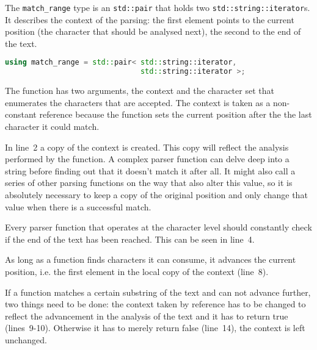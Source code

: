 \documentclass[12pt]{article}
\begin{document}
The \texttt{match\_range} type is an \texttt{std::pair} that holds two \texttt{std::string::iterator}s. It
describes the context of the parsing: the first element points to the current position (the character that
should be analysed next), the second to the end of the text.

\begin{center}
	\begin{minipage}[h]{0.8\textwidth}
		\begin{lstlisting}[language=C++, breaklines=true]
using match_range = std::pair< std::string::iterator,
                               std::string::iterator >;
		\end{lstlisting}
	\end{minipage}
\end{center}

The function has two arguments, the context and the character set that enumerates the characters that are
accepted. The context is taken as a non-constant reference because the function sets the current position
after the the last character it could match.

In line~2 a copy of the context is created. This copy will reflect the analysis performed by the function. A
complex parser function can delve deep into a string before finding out that it doesn't match it after all. It
might also call a series of other parsing functions on the way that also alter this value, so it is absolutely
necessary to keep a copy of the original position and only change that value when there is a successful match.

Every parser function that operates at the character level should constantly check if the end of the text has
been reached. This can be seen in line~4.

As long as a function finds characters it can consume, it advances the current position, i.e. the first
element in the local copy of the context (line~8).

If a function matches a certain substring of the text and can not advance further, two things need to be done:
the context taken by reference has to be changed to reflect the advancement in the analysis of the text and it
has to return true (lines~9-10). Otherwise it has to merely return false (line~14), the context is left
unchanged.

\end{document}
